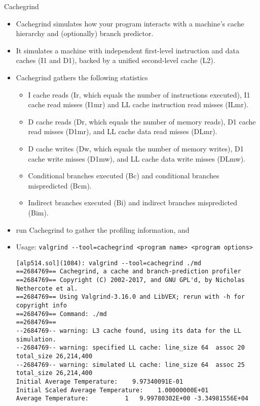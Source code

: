 \documentclass[10pt,t]{beamer}
\begin{document}
\begin{frame}{Cachegrind}
  \begin{itemize}
    \item Cachegrind simulates how your program interacts with a machine's cache hierarchy and (optionally) branch predictor.
    \item It simulates a machine with independent first-level instruction and data caches (I1 and D1), backed by a unified second-level cache (L2).
    \item Cachegrind gathers the following statistics
      \begin{itemize}
        \item I cache reads (Ir, which equals the number of instructions executed), I1 cache read misses (I1mr) and LL cache instruction read misses (ILmr).
        \item D cache reads (Dr, which equals the number of memory reads), D1 cache read misses (D1mr), and LL cache data read misses (DLmr).
        \item D cache writes (Dw, which equals the number of memory writes), D1 cache write misses (D1mw), and LL cache data write misses (DLmw).
        \item Conditional branches executed (Bc) and conditional branches mispredicted (Bcm).
        \item Indirect branches executed (Bi) and indirect branches mispredicted (Bim).
      \end{itemize}
    \item run Cachegrind to gather the profiling information, and
    \item Usage: \lstinline|valgrind --tool=cachegrind <program name> <program options> |
      \begin{lstlisting}[basicstyle=\fontsize{4.5}{5.5}\selectfont\ttfamily]
[alp514.sol](1084): valgrind --tool=cachegrind ./md
==2684769== Cachegrind, a cache and branch-prediction profiler
==2684769== Copyright (C) 2002-2017, and GNU GPL'd, by Nicholas Nethercote et al.
==2684769== Using Valgrind-3.16.0 and LibVEX; rerun with -h for copyright info
==2684769== Command: ./md
==2684769==
--2684769-- warning: L3 cache found, using its data for the LL simulation.
--2684769-- warning: specified LL cache: line_size 64  assoc 20  total_size 26,214,400
--2684769-- warning: simulated LL cache: line_size 64  assoc 25  total_size 26,214,400
Initial Average Temperature:    9.97340091E-01
Initial Scaled Average Temperature:    1.00000000E+01
Average Temperature:          1   9.99780302E+00 -3.34981556E+04

\end{lstlisting}
\end{itemize}
\end{frame}
\end{document}
